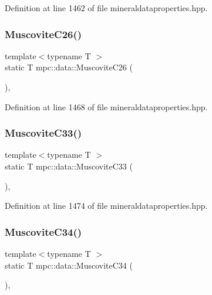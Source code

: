 Definition at line 1462 of file mineraldataproperties.\+hpp.

\mbox{\label{namespacempc_1_1data_a6b53137b363f4941d00380d4d9f6b68a}} 
\subsubsection{\texorpdfstring{Muscovite\+C26()}{MuscoviteC26()}}
{\footnotesize\ttfamily template$<$typename T $>$ \\
static T mpc\+::data\+::\+Muscovite\+C26 (\begin{DoxyParamCaption}{ }\end{DoxyParamCaption})\hspace{0.3cm}{\ttfamily [inline]}, {\ttfamily [static]}}



Definition at line 1468 of file mineraldataproperties.\+hpp.

\mbox{\label{namespacempc_1_1data_a82396821c2b90ea12e05cb9815b84a4e}} 
\subsubsection{\texorpdfstring{Muscovite\+C33()}{MuscoviteC33()}}
{\footnotesize\ttfamily template$<$typename T $>$ \\
static T mpc\+::data\+::\+Muscovite\+C33 (\begin{DoxyParamCaption}{ }\end{DoxyParamCaption})\hspace{0.3cm}{\ttfamily [inline]}, {\ttfamily [static]}}



Definition at line 1474 of file mineraldataproperties.\+hpp.

\mbox{\label{namespacempc_1_1data_a3be55c61f1d0329ce6e4d804ee8f16fa}} 
\subsubsection{\texorpdfstring{Muscovite\+C34()}{MuscoviteC34()}}
{\footnotesize\ttfamily template$<$typename T $>$ \\
static T mpc\+::data\+::\+Muscovite\+C34 (\begin{DoxyParamCaption}{ }\end{DoxyParamCaption})\hspace{0.3cm}{\ttfamily [inline]}, {\ttfamily [static]}}



